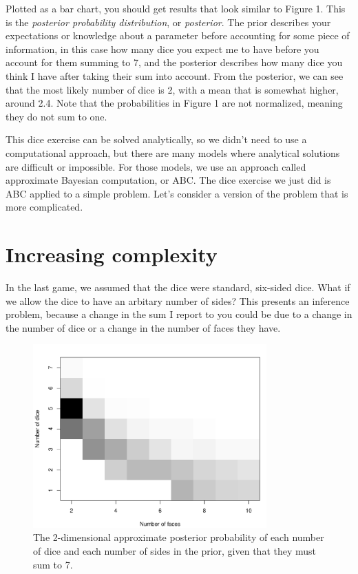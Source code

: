 \documentclass[a4paper,10pt]{article}
\begin{document}
Plotted as a bar chart, you should get results that look similar to Figure 1.  This is the \textit{posterior probability distribution}, or \textit{posterior}.  The prior describes your expectations or knowledge about a parameter before accounting for some piece of information, in this case how many dice you expect me to have before you account for them summing to 7, and the posterior describes how many dice you think I have after taking their sum into account.  From the posterior, we can see that the most likely number of dice is 2, with a mean that is somewhat higher, around 2.4.  Note that the probabilities in Figure 1 are not normalized, meaning they do not sum to one.

This dice exercise can be solved analytically, so we didn't need to use a computational approach, but there are many models where analytical solutions are difficult or impossible.  For those models, we use an approach called approximate Bayesian computation, or ABC.  The dice exercise we just did is ABC applied to a simple problem.  Let's consider a version of the problem that is more complicated.

\section{Increasing complexity}
In the last game, we assumed that the dice were standard, six-sided dice.  What if we allow the dice to have an arbitary number of sides?  This presents an inference problem, because a change in the sum I report to you could be due to a change in the number of dice or a change in the number of faces they have.

\begin{figure}[h]
 \centering
 \includegraphics[width=0.80\textwidth]{./dice_vs_faces.pdf}
 \caption{The 2-dimensional approximate posterior probability of each number of dice and each number of sides in the prior, given that they must sum to 7.}
 \label{fig:dice_likelihood}
\end{figure}
\end{document}
